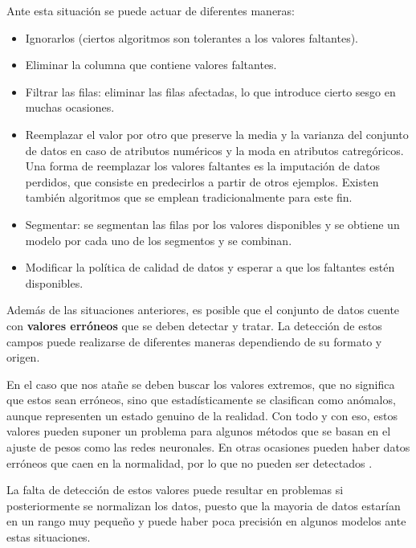 Ante esta situación se puede actuar de diferentes maneras:
\begin{itemize}
    \item Ignorarlos (ciertos algoritmos son tolerantes a los valores faltantes).
    \item Eliminar la columna que contiene valores faltantes.
    \item Filtrar las filas: eliminar las filas afectadas, lo que introduce cierto sesgo en muchas ocasiones.
    \item Reemplazar el valor por otro que preserve la media y la varianza del conjunto de datos en caso de atributos numéricos y la moda en atributos
        catregóricos.
        Una forma de reemplazar los valores faltantes es la imputación de datos perdidos, que consiste en predecirlos a partir de otros ejemplos. Existen también
        algoritmos que se emplean tradicionalmente para este fin.
    \item Segmentar: se segmentan las filas por los valores disponibles y se obtiene un modelo por cada uno de los segmentos y se combinan.
    \item Modificar la política de calidad de datos y esperar a que los faltantes estén disponibles.
\end{itemize}

Además de las situaciones anteriores, es posible que el conjunto de datos cuente con \textbf{valores erróneos} que 
se deben detectar y tratar.
La detección de estos campos puede realizarse de diferentes maneras dependiendo de su formato y origen.

En el caso que nos atañe se deben buscar los valores extremos, que no significa que estos sean erróneos, sino que 
estadísticamente se clasifican como anómalos, aunque representen un estado genuino de la realidad.
Con todo y con eso, estos valores pueden suponer un problema para algunos métodos que se basan en el ajuste de pesos
como las redes neuronales.
En otras ocasiones pueden haber datos erróneos que caen en la normalidad, por lo que no pueden ser detectados \cite{book:hernandez2004}.

La falta de detección de estos valores puede resultar en problemas si posteriormente se normalizan los datos, puesto
que la mayoria de datos estarían en un rango muy pequeño y puede haber poca precisión en algunos modelos ante estas situaciones.

